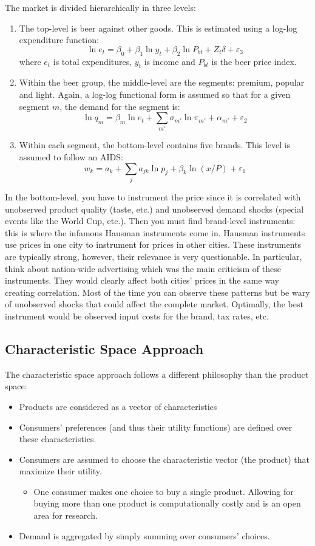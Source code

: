 The market is divided hierarchically in three levels:\begin{enumerate}
\item The top-level is beer against other goods. This is estimated using a log-log expenditure function: $$\ln e_t = \beta_0 + \beta_1 \ln y_t + \beta_2 \ln P_{bt} + Z_t\delta + \varepsilon_3 $$ where $e_t$ is total expenditures, $y_t$ is income and $P_{bt}$ is the beer price index.
\item Within the beer group, the middle-level are the segments: premium, popular and light. Again, a log-log functional form is assumed so that for a given segment $m$, the demand for the segment is: $$\ln q_m = \beta_m \ln e_t + \sum_{m'} \sigma_{m'} \ln \pi_{m'} + \alpha_{m'} + \varepsilon_2 $$
\item Within each segment, the bottom-level contains five brands. This level is assumed to follow an AIDS: $$w_k = a_k + \sum_{j} a_{jk} \ln p_j + \beta_k \ln (x/P) + \varepsilon_1 $$
\end{enumerate}

In the bottom-level, you have to instrument the price since it is correlated with unobserved product quality (taste, etc.) and unobserved demand shocks (special events like the World Cup, etc.). Then you must find brand-level instruments: this is where the infamous Hausman instruments come in. Hausman instruments use prices in one city to instrument for prices in other cities. These instruments are typically strong, however, their relevance is very questionable. In particular, think about nation-wide advertising which was the main criticism of these instruments. They would clearly affect both cities' prices in the same way creating correlation. Most of the time you can observe these patterns but be wary of unobserved shocks that could affect the complete market. Optimally, the best instrument would be observed input costs for the brand, tax rates, etc.

\subsection{Characteristic Space Approach}

The characteristic space approach follows a different philosophy than the product space:\begin{itemize}
\item Products are considered as a vector of characteristics
\item Consumers' preferences (and thus their utility functions) are defined over these characteristics.
\item Consumers are assumed to choose the characteristic vector (the product) that maximize their utility.
\begin{itemize}
\item One consumer makes one choice to buy a single product. Allowing for buying more than one product is computationally costly and is an open area for research.
\end{itemize}
\item Demand is aggregated by simply summing over consumers' choices.
\end{itemize}

